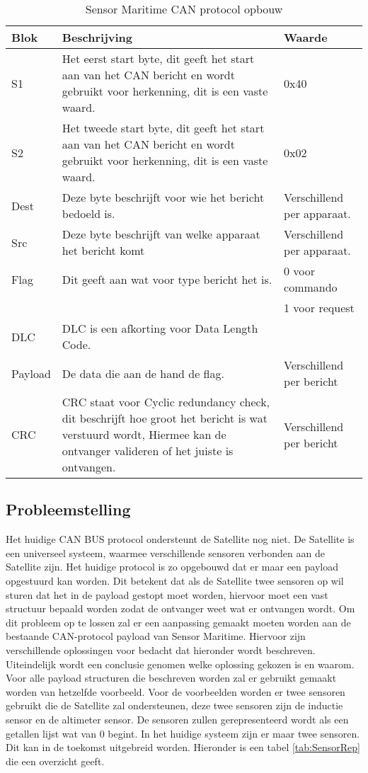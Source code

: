\begin{table}[h!]
	\caption{Sensor Maritime CAN protocol opbouw}
	\label{tab:cansensorprotocol}
	\begin{tabular}{p{1.5cm}p{10.5cm}p{3cm}}
	\toprule
	\textbf{Blok} & \textbf{Beschrijving} & \textbf{Waarde}\\ \midrule
	S1		& Het eerst start byte, dit geeft het start aan van het CAN bericht en wordt gebruikt voor herkenning, dit is een vaste waard.	& 0x40 \\
	S2		& Het tweede start byte, dit geeft het start aan van het CAN bericht en wordt gebruikt voor herkenning, dit is een vaste waard. & 0x02 \\
	Dest	& Deze byte beschrijft voor wie het bericht bedoeld is.		& Verschillend per apparaat. \\
	Src		& Deze byte beschrijft van welke apparaat het bericht komt	& Verschillend per apparaat.\\ 
	Flag	& Dit geeft aan wat voor type bericht het is.             & 0 voor commando \\ 
			& & 1 voor request \\ 
	DLC		& DLC is een afkorting voor Data Length Code.             & \\ 
	Payload	& De data die aan de hand de flag. & Verschillend per bericht\\
	CRC		& CRC staat voor Cyclic redundancy check, dit beschrijft hoe groot het bericht is wat verstuurd wordt, Hiermee kan de ontvanger valideren of het juiste is ontvangen. & Verschillend per bericht\\ \bottomrule
	\end{tabular}
\end{table}

\subsection{Probleemstelling}
Het huidige CAN BUS protocol ondersteunt de Satellite nog niet. De Satellite is een universeel systeem, waarmee verschillende sensoren verbonden aan de Satellite zijn. Het huidige protocol is zo opgebouwd dat er maar een payload opgestuurd kan worden. Dit betekent dat als de Satellite twee sensoren op wil sturen dat het in de payload gestopt moet worden, hiervoor moet een vast structuur bepaald worden zodat de ontvanger weet wat er ontvangen wordt. Om dit probleem op te lossen zal er een aanpassing gemaakt moeten worden aan de bestaande CAN-protocol payload van Sensor Maritime. Hiervoor zijn verschillende oplossingen voor bedacht dat hieronder wordt beschreven. Uiteindelijk wordt een conclusie genomen welke oplossing gekozen is en waarom. Voor alle payload structuren die beschreven worden zal er gebruikt gemaakt worden van hetzelfde voorbeeld. Voor de voorbeelden worden er twee sensoren gebruikt die de Satellite zal ondersteunen, deze twee sensoren zijn de inductie sensor en de altimeter sensor. De sensoren zullen gerepresenteerd wordt als een getallen lijst wat van 0 begint. In het huidige systeem zijn er maar twee sensoren. Dit kan in de toekomst uitgebreid worden. Hieronder is een tabel \ref{tab:SensorRep} die een overzicht geeft.

